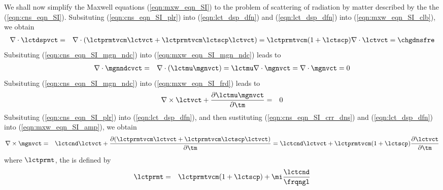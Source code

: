 \documentclass[12pt]{article}
\begin{document}
We shall now simplify the Maxwell equations (\ref{eqn:mxw_eqn_SI}) to
the problem of scattering of radiation by matter described by the 
the  (\ref{eqn:cns_eqn_SI}).
Subsituting (\ref{eqn:cns_eqn_SI_plr}) into (\ref{eqn:lct_dsp_dfn})
and (\ref{eqn:lct_dsp_dfn}) into (\ref{eqn:mxw_eqn_SI_clb}), we
obtain  
\begin{eqnarray}
\nabla \cdot \lctdspvct & = & 
\nabla \cdot ( \lctprmtvcm \lctvct + \lctprmtvcm \lctscp \lctvct)
= \lctprmtvcm ( 1 + \lctscp ) \nabla \cdot \lctvct = \chgdnsfre
\label{eqn:mxw_eqn_gss_cns}
\end{eqnarray} 
Subsituting (\ref{eqn:cns_eqn_SI_mgn_ndc}) into
(\ref{eqn:mxw_eqn_SI_mgn_ndc}) leads to 
\begin{eqnarray}
\nabla \cdot \mgnndcvct & = & \nabla \cdot ( \lctmu \mgnvct ) = 
\lctmu \nabla \cdot \mgnvct = \nabla \cdot \mgnvct = 0
\label{eqn:mxw_eqn_mgn_ndc_cns}
\end{eqnarray} 
Subsituting (\ref{eqn:cns_eqn_SI_mgn_ndc}) into
(\ref{eqn:mxw_eqn_SI_frd}) leads to 
\begin{eqnarray}
\nabla \times \lctvct + \frac{\partial \lctmu \mgnvct}{\partial \tm} 
& = & 0
\label{eqn:mxw_eqn_frd_cns}
\end{eqnarray} 
Subsituting (\ref{eqn:cns_eqn_SI_plr}) into
(\ref{eqn:lct_dsp_dfn}), and then sustituting 
(\ref{eqn:cns_eqn_SI_crr_dns}) and (\ref{eqn:lct_dsp_dfn}) into
(\ref{eqn:mxw_eqn_SI_amp}), we obtain  
\begin{eqnarray}
\nabla \times \mgnvct & = &
\lctcnd \lctvct + 
\frac{\partial(\lctprmtvcm \lctvct + \lctprmtvcm \lctscp
\lctvct)}{\partial \tm} =
\lctcnd \lctvct + \lctprmtvcm ( 1 + \lctscp) 
\frac{\partial \lctvct}{\partial \tm}
\label{eqn:mxw_eqn_amp_cns}
\end{eqnarray} 
where $\lctprmt$, the  is defined by
\begin{eqnarray}
\lctprmt & = & \lctprmtvcm ( 1 + \lctscp ) + \mi \frac{\lctcnd}{\frqngl}
\label{eqn:lct_prmt_dfn}
\end{eqnarray}
\end{document}
